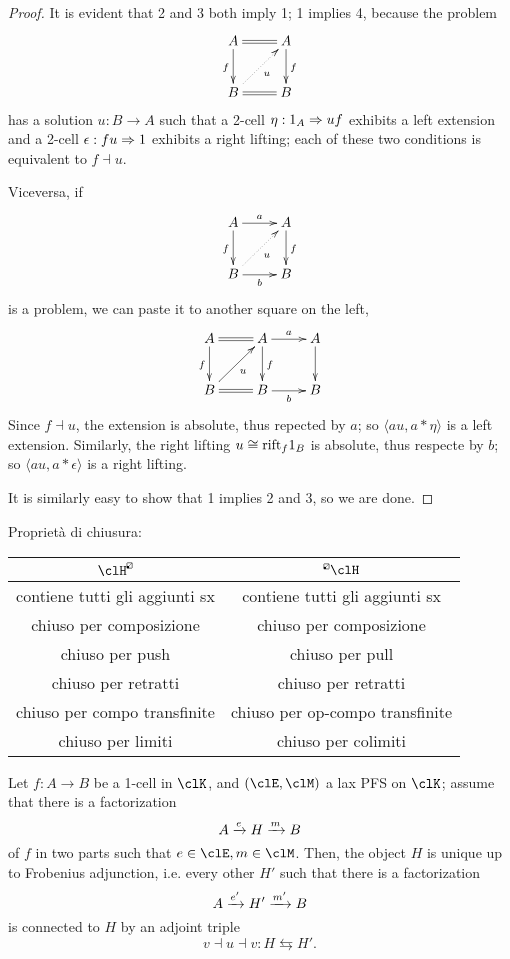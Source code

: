 \documentclass{amsart}
\newcommand{\dolp}[1]{\mathrel{
  \begin{tikzpicture}[scale=#1]
    \draw[rounded corners=.25pt, line width=.4pt] (0,0) rectangle (1,1);
    \draw[line width=.3pt] (0,0) -- (1,1);
    \fill (0,0) rectangle (.4,.4);
    \end{tikzpicture}
}}
\newcommand{\lp}{
\mathchoice{\dolp{.165}}
  {\dolp{.165}}
  {\mathrel{\dolp{.1325}}}
  {\mathrel{\dolp{.1}}}
}
\begin{document}
\begin{proof}
  It is evident that 2 and 3 both imply 1; 1 implies 4, because the problem
  \[
  \xymatrix{
    A \ar[d]_f \ar@{=}[r]& A\ar[d]^f  \\
    B \ar@{.>}[ur]_u \ar@{=}[r]& B
  }  
  \]
  has a solution $u : B \to A$ such that a 2-cell $\eta : 1_A \Rightarrow uf$ exhibits a left extension and a 2-cell $\epsilon : fu \Rightarrow 1$ exhibits a right lifting; each of these two conditions is equivalent to $f \dashv u$.

  Viceversa, if 
  \[
  \xymatrix{
    A \ar[d]_f \ar[r]^a & A\ar[d]^f  \\
    B \ar@{.>}[ur]_u \ar[r]_b & B
  }  
  \]
  is a problem, we can paste it to another square on the left, 
  \[
  \xymatrix{
    A \ar[d]_f \ar@{=}[r]& A\ar[d]^f \ar[r]^a  & A \ar[d]\\
    B \ar[ur]_u \ar@{=}[r]& B \ar[r]_b & B
  }  
  \]
  Since $f\dashv u$, the extension is absolute, thus repected by $a$; so $\langle au, a * \eta\rangle$ is a left extension. Similarly, the right lifting $u\cong\mathrm{rift}_f 1_B$ is absolute, thus respecte by $b$; so $\langle au,a * \epsilon\rangle$ is a right lifting.

  It is similarly easy to show that 1 implies 2 and 3, so we are done.
\end{proof}
\begin{proposition}
  Proprietà di chiusura:
\begin{center}
  \begin{tabular}{@{}cc@{}}
  \toprule
  $\clH^{\lp}$                 & ${}^{\lp}\clH$                  \\ \midrule
  contiene tutti gli aggiunti sx       & contiene tutti gli aggiunti sx          \\
  chiuso per composizione      & chiuso per composizione         \\
  chiuso per push              & chiuso per pull                 \\
  chiuso per retratti          & chiuso per retratti             \\
  chiuso per compo transfinite & chiuso per op-compo transfinite \\ 
  chiuso per limiti & chiuso per colimiti \\ \bottomrule
  \end{tabular}
\end{center}
\end{proposition}
\begin{proposition}
  Let $f : A \to B$ be a 1-cell in $\clK$, and $(\clE,\clM)$ a lax PFS on $\clK$; assume that there is a factorization $$A \xrightarrow{e} H\xrightarrow{m} B$$ of $f$ in two parts such that $e\in\clE, m\in\clM$. Then, the object $H$ is unique up to Frobenius adjunction, i.e. every other $H'$ such that there is a factorization $$A \xrightarrow{e'} H' \xrightarrow{m'} B$$ is connected to $H$ by an adjoint triple $$v\dashv u\dashv v : H \leftrightarrows H'.$$
\end{proposition}
\end{document}
